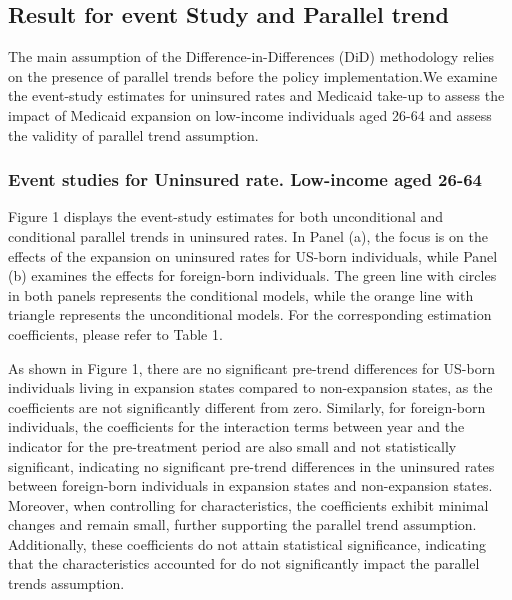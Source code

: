 \documentclass[
]{article}
\begin{document}
\hypertarget{result-for-event-study-and-parallel-trend}{%
\subsection{Result for event Study and Parallel
trend}\label{result-for-event-study-and-parallel-trend}}

The main assumption of the Difference-in-Differences (DiD) methodology
relies on the presence of parallel trends before the policy
implementation.We examine the event-study estimates for uninsured rates
and Medicaid take-up to assess the impact of Medicaid expansion on
low-income individuals aged 26-64 and assess the validity of parallel
trend assumption.

\hypertarget{event-studies-for-uninsured-rate.-low-income-aged-26-64}{%
\subsubsection{Event studies for Uninsured rate. Low-income aged
26-64}\label{event-studies-for-uninsured-rate.-low-income-aged-26-64}}

Figure 1 displays the event-study estimates for both unconditional and
conditional parallel trends in uninsured rates. In Panel (a), the focus
is on the effects of the expansion on uninsured rates for US-born
individuals, while Panel (b) examines the effects for foreign-born
individuals. The green line with circles in both panels represents the
conditional models, while the orange line with triangle represents the
unconditional models. For the corresponding estimation coefficients,
please refer to Table 1.

As shown in Figure 1, there are no significant pre-trend differences for
US-born individuals living in expansion states compared to non-expansion
states, as the coefficients are not significantly different from zero.
Similarly, for foreign-born individuals, the coefficients for the
interaction terms between year and the indicator for the pre-treatment
period are also small and not statistically significant, indicating no
significant pre-trend differences in the uninsured rates between
foreign-born individuals in expansion states and non-expansion states.
Moreover, when controlling for characteristics, the coefficients exhibit
minimal changes and remain small, further supporting the parallel trend
assumption. Additionally, these coefficients do not attain statistical
significance, indicating that the characteristics accounted for do not
significantly impact the parallel trends assumption.
\end{document}
